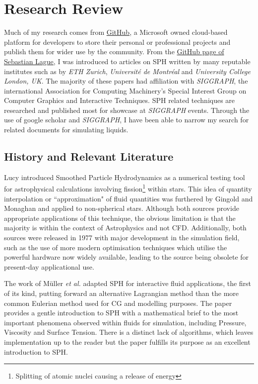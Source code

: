 \documentclass[write-up.tex]{subfiles}
\begin{document}
\section{Research Review}
Much of my research comes from \href{https://www.github.com}{GitHub}, a Microsoft owned cloud-based platform for developers to store their personal or professional projects and publish them for wider use by the community. From the \href{https://github.com/SebLague/Fluid-Sim}{GitHub page of Sebastian Lague}, I was introduced to articles on SPH written by many reputable institutes such as by \textit{ETH Zurich}, \textit{Université de Montréal} and \textit{University College London, UK}. The majority of these papers had affiliation with \textit{SIGGRAPH}, the international Association for Computing Machinery's Special Interest Group on Computer Graphics and Interactive Techniques. SPH related techniques are researched and published most for showcase at \textit{SIGGRAPH} events. Through the use of google scholar and \textit{SIGGRAPH}, I have been able to narrow my search for related documents for simulating liquids.
\subsection{History and Relevant Literature}
Lucy \cite{lucy} introduced Smoothed Particle Hydrodynamics as a numerical testing tool for astrophysical calculations involving fission\footnote{Splitting of atomic nuclei causing a release of energy} within stars. This idea of quantity interpolation or ``approximation" of fluid quantities was furthered by Gingold and Monaghan \cite{gingold} and applied to non-spherical stars. Although both sources provide appropriate applications of this technique, the obvious limitation is that the majority is within the context of Astrophysics and not CFD. Additionally, both sources were released in 1977 with major development in the simulation field, such as the use of more modern optimisation techniques which utilise the powerful hardware now widely available, leading to the source being obsolete for present-day applicational use.

The work of Müller \textit{et al.} \cite{muller} adapted SPH for interactive fluid applications, the first of its kind, putting forward an alternative Lagrangian method than the more common Eulerian method used for CG and modelling purposes. The paper provides a gentle introduction to SPH with a mathematical brief to the most important phenomena observed within fluids for simulation, including Pressure, Viscosity and Surface Tension. There is a distinct lack of algorithms, which leaves implementation up to the reader but the paper fulfills its purpose as an excellent introduction to SPH.
\end{document}

